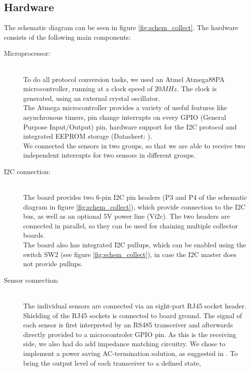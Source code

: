 \documentclass[a4paper]{scrreprt}
\begin{document}
\subsection{Hardware}
The schematic diagram can be seen in figure \ref{fig:schem_collect}. The hardware consists of the following main components:
\begin{description}
  \item[Microprocessor:]\hspace{1cm}\\
    To do all protocol conversion tasks, we used an Atmel Atmega88PA
    microcontroller, running at a clock speed of $20MHz$. The clock
    is generated, using an external crystal oscillator.\\
    The Atmega microcontroller provides a variety of useful features
    like asynchronous timers, pin change interrupts on every GPIO (General Purpose Input/Output)
    pin, hardware support for the I2C protocol and integrated EEPROM
    storage (Datasheet: \cite{atmega88}).\\
    We connected the sensors in two groups, so that we are able to
    receive two independent interrupts for two sensors in different
    groups.
  \item[I2C connection:]\hspace{1cm}\\
    The board provides two 6-pin I2C pin headers (P3 and P4 of the schematic diagram in figure \ref{fig:schem_collect}), which
    provide connection to the I2C bus, as well as an optional 5V
    power line (Vi2c). The two headers are connected in parallel,
    so they can be used for chaining multiple collector boards.\\
    The board also has integrated I2C pullups, which can be enabled
    using the switch SW2 (see figure \ref{fig:schem_collect}), in case the I2C master does not provide
    pullups.
  \item[Sensor connection:]\hspace{1cm}\\
    The individual sensors are connected via an eight-port RJ45
    socket header. Shielding of the RJ45 sockets is connected to
    board ground. The signal of each sensor is first interpreted
    by an RS485 transceiver and afterwards directly provided to a
    microcontroler GPIO pin. As this is the receiving side, we also
    had do add impedance matching circuitry. We chose to implement
    a power saving AC-termination solution, as suggested in \cite{st485appnote, rs485}.
    To bring the output level of each transceiver to a defined state,

\end{description}
\end{document}
